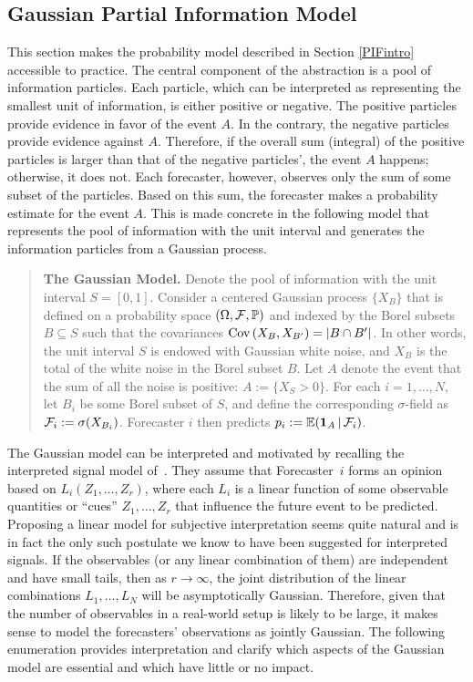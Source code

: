 \documentclass[12pt]{article}
\renewcommand{\P}{\mathbb{P}}
\newcommand{\E}{\mathbb{E}}
\theoremstyle{definition}
\theoremstyle{definition}
\def\one{{\bf 1}}
\def\F{{\cal F}}
\def\P{{\mathbb P}}
\def\E{{\mathbb E}}
\def\Cov{{\rm Cov}\,}
\def\|{\, | \,}
\begin{document}
\subsection{Gaussian Partial Information Model}
\label{ss:Gaussian}
This section makes the probability model described in Section \ref{PIFintro} accessible to practice. The central component of the abstraction is a pool of information particles. Each particle, which can be interpreted as representing the smallest unit of information, is either positive or negative. The positive particles provide evidence in favor of the event $A$. 
In the contrary, the negative particles provide evidence against $A$. Therefore, if the overall sum (integral) of the positive particles is larger than that of the negative particles', the event $A$ happens; otherwise, it does not. Each forecaster, however, observes only the sum of some subset of the particles. Based on this sum, the forecaster makes a probability estimate for the event $A$. This is made concrete in the following model that  represents the pool of information with the unit interval and generates the information particles from a Gaussian process. 

\begin{quote}
{\bf The Gaussian Model.} Denote the pool of information with the unit interval $S = [0,1]$. Consider a centered Gaussian process $\{X_B\}$ that is defined on a probability space $(\Omega
, \F , \P)$ and indexed by the Borel subsets $B \subseteq S$ such that the
covariances $\Cov (X_B , X_{B'}) = |B \cap B'|$.  In other words, the
unit interval $S$ is endowed with Gaussian white noise, and $X_B$ is the
total of the white noise in the Borel subset $B$.  Let $A$ denote the
event that the sum of all the noise is positive: $A := \{ X_S > 0 \}$.
For each $i = 1, \dots, N$, let $B_i$ be some Borel subset of $S$, and
define the corresponding $\sigma$-field as $\F_i := \sigma (X_{B_i})$. Forecaster $i$ then predicts $p_i :=
\E (\one_A \| \F_i)$.
\end{quote}

The Gaussian model can be interpreted and motivated by recalling the interpreted signal
model of~\citet{broomell2009experts}. They assume that
Forecaster~$i$ forms an opinion based on $L_i (Z_1 , \ldots , Z_r)$,
where each $L_i$ is a linear function of some observable quantities or ``cues''
$Z_1 , \ldots , Z_r$ that influence the future event to be predicted.  Proposing a linear model for subjective
interpretation seems quite natural and is in fact the only such
postulate we know to have been suggested for interpreted signals.  If
the observables (or any linear combination of them) are independent
and have small tails, then as $r \to \infty$, the joint distribution
of the linear combinations $L_1 , \ldots , L_N$ will be asymptotically
Gaussian.  Therefore, given that the number of observables in a real-world setup is likely to be large, it makes sense
to model the forecasters' observations as jointly Gaussian.  The
following enumeration provides interpretation and clarify which
aspects of the Gaussian model are essential and which have little or
no impact.
\end{document}
